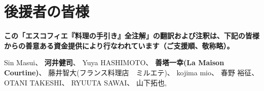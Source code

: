\hypertarget{benefactors}{%
\section{後援者の皆様}\label{benefactors}}

\thispagestyle{empty}

\small

\textbf{この「エスコフィエ『料理の手引き』全注解」の翻訳および注釈は、下記の皆様からの善意ある資金提供により行なわれています（ご支援順、敬称略）。}

\normalsize
\vspace{1\zw}

Sin Masui、\href{20180524-23h,2x,novelsoundsmail@gmail.com}{}
\textbf{河井健司}、\href{20180525-0h14,10x,kwibeng@gmail.com}{} Yuya
HASHIMOTO、\href{20180525-1h40,2x,hashimo0910@gmail.com}{}
\textbf{善塔一幸(La Maison
Courtine)}、\href{20180525-8h56,10x,kazuyukizento120@docomo.ne.jp}{}
藤井智大(フランス料理店　ミルエテ)、\href{20180525-10h07,1x,apple19761019@yahoo.co.jp}{}
kojima mio、\href{20180525-12h23,1x,teeeeshow@yahoo.co.jp}{} 春野
裕征、\href{20180528-2h41,1x,amanojack.v-o-v@i.softbank.jp}{} OTANI
TAKESHI、\href{20180529-17h26,2x,1000feuille@ezweb.ne.jp}{} RYUUTA
SAWAI、\href{20180530-2h57.1x,rs.ajtk.zz@i.softbank.jp}{}
山下拓也,\href{20180605-11h04,5x,FB:Takuya\%20Yamashita}{}
